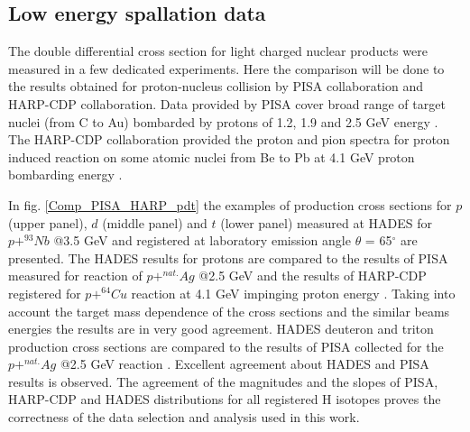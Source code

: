 \subsection{\label{spal_data} Low energy spallation data}

The double differential cross section for light charged nuclear products were measured in a few dedicated experiments. 
Here the comparison will be done to the results obtained for proton-nucleus collision by PISA collaboration 
and HARP-CDP collaboration. 
Data provided by PISA cover broad range of target nuclei (from C to Au) bombarded by protons of 1.2, 1.9 and 2.5 GeV energy \cite{bubak2007non,budzanowski2008competition,budzanowski2009variation,budzanowski2010comparison,fidelus2014sequential,fidelus2017non}. 
The HARP-CDP collaboration provided the proton and pion spectra for proton induced reaction on some atomic nuclei from Be to Pb 
at 4.1 GeV proton bombarding energy \cite{HARP_CDP_Be1_2009,HARP_CDP_Be2_2009,HARP_CDP_Ta_2009,HARP_CDP_Cu_2009,HARP_CDP_Pb_2010,
	HARP_CDP_C_2010,HARP_CDP_Sn_2011,HARP_CDP_Al_2012}.

In fig. \ref{Comp_PISA_HARP_pdt} the examples of production cross sections for 
$p$ (upper panel), $d$ (middle panel) and $t$ (lower panel) measured at HADES 
for $p+^{93}Nb$ @3.5 GeV and registered at laboratory emission angle $\theta$ = 65$^{\circ}$ are presented. 
The HADES results for protons are compared to the results of PISA measured for reaction 
of $p+^{nat.}Ag$ @2.5 GeV \cite{fidelus2017non} and the results of HARP-CDP 
registered for $p+^{64}Cu$ reaction at 4.1 GeV impinging proton energy \cite{HARP_CDP_Cu_2009}. 
Taking into account the target mass dependence of the cross sections 
and the similar beams energies the results are in very good agreement. 
HADES deuteron and triton production cross sections are compared to the results of PISA 
collected for the $p+^{nat.}Ag$ @2.5 GeV reaction \cite{fidelus2017non}. 
Excellent agreement about HADES and PISA results is observed. 
The agreement of the magnitudes and the slopes of PISA, HARP-CDP and HADES distributions 
for all registered H isotopes proves the correctness of the 
data selection and analysis used in this work. 



